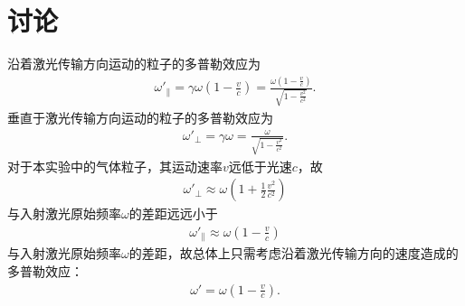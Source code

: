 \documentclass{assignment}
\begin{document}
\section{讨论}
沿着激光传输方向运动的粒子的多普勒效应为
\begin{align}
    \omega'_{\parallel}=\gamma\omega\left(1-\frac{v}{c}\right)=\frac{\omega\left(1-\frac{v}{c}\right)}{\sqrt{1-\frac{v^2}{c^2}}}.
\end{align}
垂直于激光传输方向运动的粒子的多普勒效应为
\begin{align}
    \omega'_{\perp}=\gamma\omega=\frac{\omega}{\sqrt{1-\frac{v^2}{c^2}}}.
\end{align}
对于本实验中的气体粒子，其运动速率$v$远低于光速$c$，故
\begin{align}
    \omega'_{\perp}\approx\omega\left(1+\frac{1}{2}\frac{v^2}{c^2}\right)
\end{align}
与入射激光原始频率$\omega$的差距远远小于
\begin{align}
    \omega'_{\parallel}\approx\omega\left(1-\frac{v}{c}\right)
\end{align}
与入射激光原始频率$\omega$的差距，故总体上只需考虑沿着激光传输方向的速度造成的多普勒效应：
\begin{align}
    \omega'=\omega\left(1-\frac{v}{c}\right).
\end{align}

\nocite{*}


\end{document}
